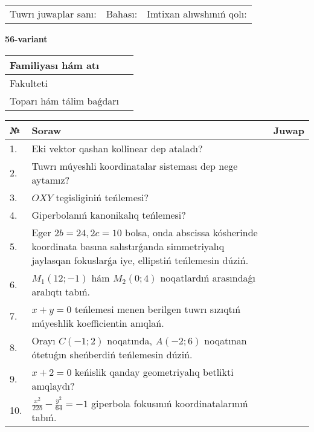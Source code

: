 \documentclass{article}
\begin{document}
\vspace{1cm}

\begin{tabular}{lll}
Tuwrı juwaplar sanı: \underline{\hspace{1.5cm}} & 
Bahası: \underline{\hspace{1.5cm}} & 
Imtixan alıwshınıń qolı: \underline{\hspace{2cm}} \\
\end{tabular}

\egroup

\newpage


\textbf{56-variant}\\

\bgroup
\def\arraystretch{1.6} %

\begin{tabular}{|m{5.7cm}|m{9.5cm}|}
\hline
Familiyası hám atı & \\
\hline
Fakulteti  & \\
\hline
Toparı hám tálim baǵdarı  & \\
\hline
\end{tabular}

\vspace{1cm}

\begin{tabular}{|m{0.7cm}|m{10cm}|m{4cm}|}
\hline
№ & Soraw & Juwap \\
\hline
1. & Eki vektor qashan kollinear dep ataladı? &  \\
\hline
2. & Tuwrı múyeshli koordinatalar sisteması dep nege aytamız? &  \\
\hline
3. & $OXY$ tegisliginiń teńlemesi? &  \\
\hline
4. & Giperbolanıń kanonikalıq teńlemesi? &  \\
\hline
5. & Eger $2b=24, 2 c=10$ bolsa, onda abscissa kósherinde koordinata basına salıstırǵanda simmetriyalıq jaylasqan fokuslarǵa iye, ellipstiń teńlemesin dúziń. &  \\
\hline
6. & $M_{1} (12;-1)$ hám $M_{2} (0;4)$ noqatlardıń arasındaǵı aralıqtı tabıń. &  \\
\hline
7. & $x+y=0$ teńlemesi menen berilgen tuwrı sızıqtıń múyeshlik koefficientin anıqlań. &  \\
\hline
8. & Orayı $C (-1;2)$ noqatında, $A (-2;6 )$ noqatınan ótetuǵın sheńberdiń teńlemesin dúziń. &  \\
\hline
9. & $x+2=0$ keńislik qanday geometriyalıq betlikti anıqlaydı? &  \\
\hline
10. & $\frac{x^{2}}{225}-\frac{y^{2}}{64}=-1$ giperbola fokusınıń koordinatalarınıń tabıń. &  \\
\hline
\end{tabular}
\end{document}
